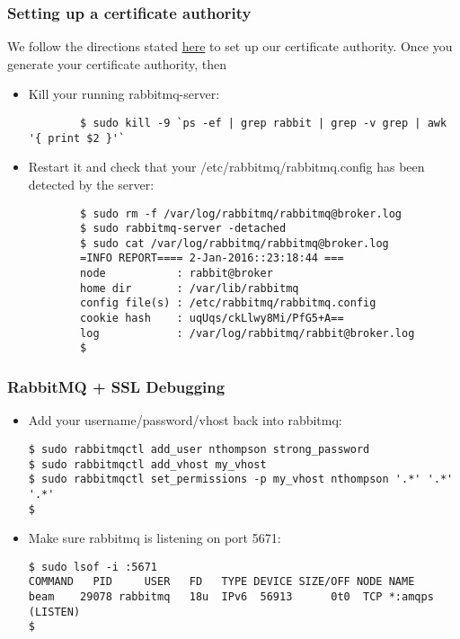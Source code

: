 \documentclass[9pt]{beamer}
\begin{document}
\begin{frame}[fragile]
  \frametitle{Setting up a certificate authority}
  We follow the directions stated \href{https://www.rabbitmq.com/ssl.html}{here} to set up our certificate authority. Once you generate your certificate authority, then
  \pause
  \begin{itemize}
    \item Kill your running rabbitmq-server:
      \begin{verbatim}
        $ sudo kill -9 `ps -ef | grep rabbit | grep -v grep | awk '{ print $2 }'`
      \end{verbatim}
      \pause
    \item Restart it and check that your /etc/rabbitmq/rabbitmq.config has been detected by the server:
      \begin{verbatim}
        $ sudo rm -f /var/log/rabbitmq/rabbitmq@broker.log
        $ sudo rabbitmq-server -detached
        $ sudo cat /var/log/rabbitmq/rabbitmq@broker.log
        =INFO REPORT==== 2-Jan-2016::23:18:44 ===
        node           : rabbit@broker
        home dir       : /var/lib/rabbitmq
        config file(s) : /etc/rabbitmq/rabbitmq.config
        cookie hash    : uqUqs/ckLlwy8Mi/PfG5+A==
        log            : /var/log/rabbitmq/rabbit@broker.log
        $
      \end{verbatim}

  \end{itemize}
\end{frame}

\begin{frame}[fragile]
\frametitle{RabbitMQ + SSL Debugging}
\begin{itemize}
\item Add your username/password/vhost back into rabbitmq:
\begin{verbatim}
$ sudo rabbitmqctl add_user nthompson strong_password
$ sudo rabbitmqctl add_vhost my_vhost
$ sudo rabbitmqctl set_permissions -p my_vhost nthompson '.*' '.*' '.*'
$
\end{verbatim}
\pause
\item Make sure rabbitmq is listening on port 5671:
\begin{verbatim}
$ sudo lsof -i :5671
COMMAND   PID     USER   FD   TYPE DEVICE SIZE/OFF NODE NAME
beam    29078 rabbitmq   18u  IPv6  56913      0t0  TCP *:amqps (LISTEN)
$
\end{verbatim}
\end{itemize}
\end{frame}
\end{document}
